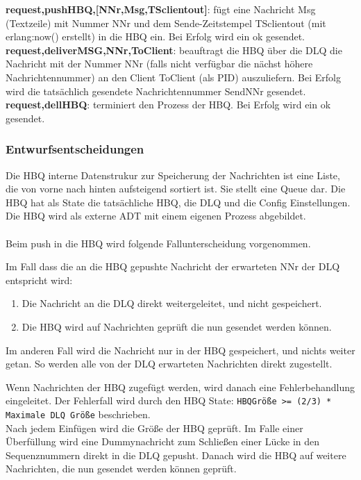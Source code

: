 \documentclass{article}
\begin{document}
\textbf{{request,pushHBQ,[NNr,Msg,TSclientout]}}: fügt eine Nachricht Msg (Textzeile) mit Nummer NNr und dem
Sende-Zeitstempel TSclientout (mit erlang:now() erstellt) in die HBQ ein. Bei Erfolg wird ein ok gesendet.\\

\textbf{{request,deliverMSG,NNr,ToClient}}: beauftragt die HBQ über die DLQ die Nachricht mit der Nummer NNr
(falls nicht verfügbar die nächst höhere Nachrichtennummer) an den Client ToClient (als PID) auszuliefern. Bei Erfolg
wird die tatsächlich gesendete Nachrichtennummer SendNNr gesendet.\\

\textbf{{request,dellHBQ}}: terminiert den Prozess der HBQ. Bei Erfolg wird ein ok gesendet.\\

\subsubsection{Entwurfsentscheidungen}
Die HBQ interne Datenstrukur zur Speicherung der Nachrichten ist eine Liste, die von vorne nach hinten aufsteigend
sortiert ist. Sie stellt eine Queue dar. Die HBQ hat als State die tatsächliche HBQ, die DLQ und die Config
Einstellungen. Die HBQ wird als externe ADT mit einem eigenen Prozess abgebildet.\\
\\
Beim push in die HBQ wird folgende Fallunterscheidung vorgenommen.

Im Fall dass die an die HBQ gepushte Nachricht der erwarteten NNr der DLQ entspricht wird:
	\begin{enumerate}
		\item{Die Nachricht an die DLQ direkt weitergeleitet, und nicht gespeichert.}
		\item{Die HBQ wird auf Nachrichten geprüft die nun gesendet werden können.}
	\end{enumerate}

Im anderen Fall wird die Nachricht nur in der HBQ gespeichert, und nichts weiter getan.
So werden alle von der DLQ erwarteten Nachrichten direkt zugestellt. 

Wenn Nachrichten der HBQ zugefügt werden, wird danach eine Fehlerbehandlung eingeleitet. Der Fehlerfall wird durch den
HBQ State: \texttt{HBQGröße >= (2/3) * Maximale DLQ Größe} beschrieben.\\

Nach jedem Einfügen wird die Größe der HBQ geprüft. Im Falle einer Überfüllung
wird eine Dummynachricht zum Schließen einer Lücke in den Sequenznummern direkt in 
die DLQ gepusht. Danach wird die HBQ auf weitere Nachrichten, die nun gesendet werden können geprüft.
\end{document}
